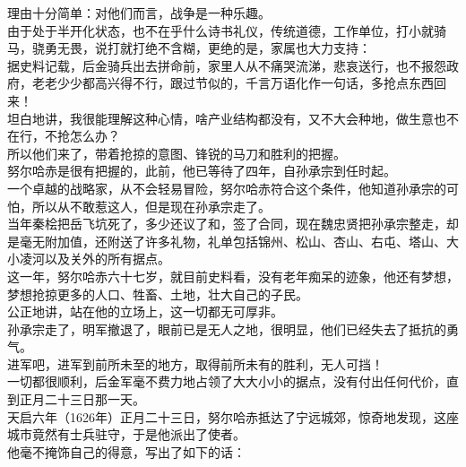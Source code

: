 \begin{multicols}{\theparacolNo}
理由十分简单：对他们而言，战争是一种乐趣。\\

由于处于半开化状态，也不在乎什么诗书礼仪，传统道德，工作单位，打小就骑马，骁勇无畏，说打就打绝不含糊，更绝的是，家属也大力支持：\\

据史料记载，后金骑兵出去拼命前，家里人从不痛哭流涕，悲哀送行，也不报怨政府，老老少少都高兴得不行，跟过节似的，千言万语化作一句话，多抢点东西回来！\\

坦白地讲，我很能理解这种心情，啥产业结构都没有，又不大会种地，做生意也不在行，不抢怎么办？\\

所以他们来了，带着抢掠的意图、锋锐的马刀和胜利的把握。\\

努尔哈赤是很有把握的，此前，他已等待了四年，自孙承宗到任时起。\\

一个卓越的战略家，从不会轻易冒险，努尔哈赤符合这个条件，他知道孙承宗的可怕，所以从不敢惹这人，但是现在孙承宗走了。\\

当年秦桧把岳飞坑死了，多少还议了和，签了合同，现在魏忠贤把孙承宗整走，却是毫无附加值，还附送了许多礼物，礼单包括锦州、松山、杏山、右屯、塔山、大小凌河以及关外的所有据点。\\

这一年，努尔哈赤六十七岁，就目前史料看，没有老年痴呆的迹象，他还有梦想，梦想抢掠更多的人口、牲畜、土地，壮大自己的子民。\\

公正地讲，站在他的立场上，这一切都无可厚非。\\

孙承宗走了，明军撤退了，眼前已是无人之地，很明显，他们已经失去了抵抗的勇气。\\

进军吧，进军到前所未至的地方，取得前所未有的胜利，无人可挡！\\

一切都很顺利，后金军毫不费力地占领了大大小小的据点，没有付出任何代价，直到正月二十三日那一天。\\

天启六年（1626年）正月二十三日，努尔哈赤抵达了宁远城郊，惊奇地发现，这座城市竟然有士兵驻守，于是他派出了使者。\\

他毫不掩饰自己的得意，写出了如下的话：\\


\end{multicols}
